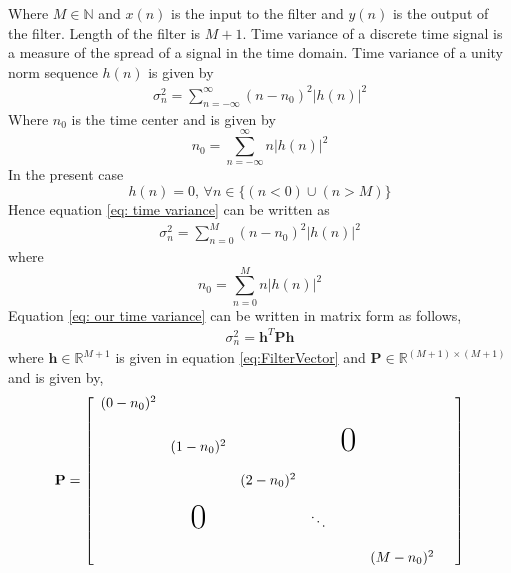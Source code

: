 Where $M \in \mathbb{N}$ and $x(n)$ is the input to the filter and $y(n)$ is the output of the filter. Length of the filter is $M+1$. Time variance of a discrete time signal is a measure of the spread of a signal in the time domain. Time variance of a unity norm sequence $h(n)$ is given by
\begin{eqnarray}
\label{eq: time variance}
\sigma_n^2 = \sum_{n=-\infty}^{\infty}(n-n_0)^2 |h(n)|^2
\end{eqnarray}
Where $n_0$ is the time center and is given by
\begin{equation}
n_0 = \sum_{n=-\infty}^{\infty} n |h(n)|^2
\end{equation}
In the present case 
\begin{equation*}
\label{eq: h(n) zero}
h(n)=0 ,\, \forall n \in \{ (n < 0) \cup (n > M)\}
\end{equation*}
Hence equation \ref{eq: time variance} can be written as
\begin{eqnarray}
\label{eq: our time variance}
\sigma_n^2 = \sum_{n=0}^{M}(n-n_0)^2 |h(n)|^2
\end{eqnarray}
where
\begin{equation}
n_0 = \sum_{n=0}^{M} n |h(n)|^2
\end{equation} 
Equation \ref{eq: our time variance} can be written in matrix form as follows,
\begin{eqnarray}
\label{eq: time variance quad. form}
\sigma_n^2 = \mathbf{h}^T\mathbf{Ph}
\end{eqnarray}
where $\mathbf{h} \in \mathbb{R}^{M+1}$ is given in equation \ref{eq:FilterVector}
and $\mathbf{P} \in \mathbb{R}^{(M+1) \times (M+1)}$ and is given by,
\begin{equation}
\label{eq: time variance matrix}
\mathbf{P} = 
\left[
\begin{array}{ccccccc}
(0-n_0)^2 &                &            &           &                &               &\\ 
\\
          & (1-n_0)^2      &            &           &\text{\Huge{0}} &               &\\ 
\\
		  &		           & (2-n_0)^2  &           &                &               &\\
\\
          &\text{\Huge{0}} &	        &  \ddots   &                &               &\\
\\
          &  	           &            &           &                & (M - n_0)^2   &          

\end{array}
\right]
\end{equation}
